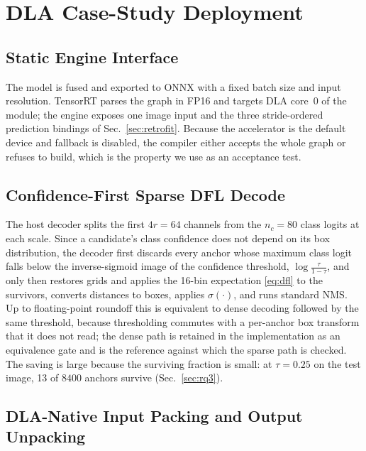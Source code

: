 \section{DLA Case-Study Deployment}
\label{sec:deployment}

\subsection{Static Engine Interface}

The model is fused and exported to ONNX with a fixed batch size and input
resolution. TensorRT parses the graph in FP16 and targets DLA core~0 of the
module; the engine exposes one image input and the three stride-ordered
prediction bindings of Sec.~\ref{sec:retrofit}. Because the accelerator is the
default device and fallback is disabled, the compiler either accepts the whole
graph or refuses to build, which is the property we use as an acceptance test.

\subsection{Confidence-First Sparse DFL Decode}

The host decoder splits the first $4r=64$ channels from the $n_c=80$ class
logits at each scale. Since a candidate's class confidence does not depend on
its box distribution, the decoder first discards every anchor whose maximum
class logit falls below the inverse-sigmoid image of the confidence threshold,
$\log\frac{\tau}{1-\tau}$, and only then restores grids and applies the 16-bin
expectation \eqref{eq:dfl} to the survivors, converts distances to boxes,
applies $\sigma(\cdot)$, and runs standard NMS. Up to floating-point roundoff
this is equivalent to dense decoding followed by the same threshold, because
thresholding commutes with a per-anchor box transform that it does not read;
the dense path is retained in the implementation as an equivalence gate and is
the reference against which the sparse path is checked. The saving is large
because the surviving fraction is small: at $\tau=0.25$ on the test image, 13 of
$8400$ anchors survive (Sec.~\ref{sec:rq3}).

\subsection{DLA-Native Input Packing and Output Unpacking}
\label{sec:packing}

